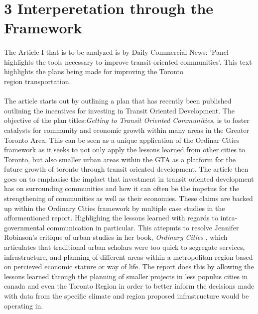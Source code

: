 \documentclass[12pt]{book}
\begin{document}
\section*{3 Interperetation through the Framework} %
\paragraph*{}
The Article I that is to be analyzed is by Daily Commercial News: 'Panel highlights the tools necessary to improve transit-oriented communities'.
This text highlights the plans being made for improving the Toronto \\region transportation.\cite{article}

\paragraph*{}
The article starts out by outlining a plan that has recently been published outlining the incentives for 
investing in Transit Oriented Development. The objective of the plan titles:\textit{Getting to Transit Oriented Communities}, is to foster
catalysts for community and economic growth within many areas in the Greater Toronto Area. This can be seen as a unique application 
of the Ordinar Cities framework as it seeks to not only apply the lessons learned from other cities to Toronto, but also smaller 
urban areas within the GTA as a platform for the future growth of toronto through transit oriented development.\cite{article}
The article then goes on to emphasise the implact that investment in transit oriented development has on surrounding communities and 
how it can often be the impetus for the strengthening of communities as well as their economies. These claims are backed up within the 
Ordinary Cities framework by multiple case studies in the afformentioned report. Highlighing the lessons learned with regards to intra-
governmental communication in particular. This attepmts to resolve Jennifer Robinson's critique of urban studies in her book, \textit{Ordinary Cities}
, which articulates that traditional urban scholars were too quick to segregate services, infrastructure, and planning of  different 
areas within a metropolitan region based on percieved economic stature or way of life.\cite{essay} The report does this by allowing the lessons learned 
through the planning of smaller projects in less populus cities in canada and even the Toronto Region in order to better inform the 
decisions made with data from the specific climate and region proposed infrastructure would be operating in.
\end{document}
